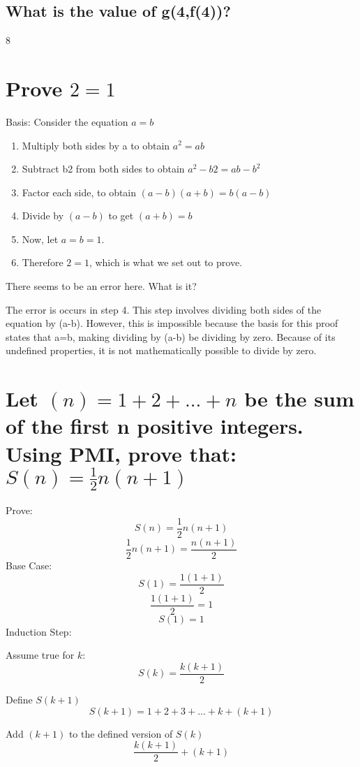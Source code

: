 \documentclass{article}
\begin{document}
\subsection{What is the value of g(4,f(4))?}
\begin{center}
	8
\end{center}

\section{Prove $2 = 1$}
Basis: Consider the equation $a = b$
\begin{enumerate}
	\item Multiply both sides by a to obtain $a^{2} = ab$
	\item Subtract b2 from both sides to obtain $a^2 - b2 = ab - b^2$
	\item Factor each side, to obtain $(a-b)(a+b) = b(a-b)$
	\item Divide by $(a - b)$ to get $(a+b) = b$
	\item Now, let $a = b = 1$.  
	\item Therefore $2 = 1$, which is what we set out to prove.
\end{enumerate}
There seems to be an error here.  What is it?

\begin{center}
	The error is occurs in step 4.
	This step involves dividing both sides of the equation by (a-b). However, this is impossible because the basis for this proof states that a=b, making dividing by (a-b) be dividing by zero. Because of its undefined properties, it is not mathematically possible to divide by zero.
\end{center}

\section{Let $(n) = 1 + 2 + ... + n$ be the sum of the first n positive integers. Using PMI, prove that: $S(n) = \frac{1}{2}n(n+1)$}

Prove: 
$$S(n) = \frac{1}{2}n(n+1)$$
$$\frac{1}{2}n(n+1) = \frac{n(n+1)}{2}$$
Base Case:
$$S(1) = \frac{1(1+1)}{2}$$
$$\frac{1(1+1)}{2} = 1$$
$$S(1) = 1$$
Induction Step:
    
Assume true for $k$:
$$S(k) = \frac{k(k+1)}{2}$$
    
Define $S(k+1)$
$$S(k+1) = 1 + 2 + 3 + ... + k + (k+1)$$
    
Add $(k+1)$ to the defined version of $S(k)$
$$\frac{k(k+1)}{2}+(k+1)$$
    
\end{document}
